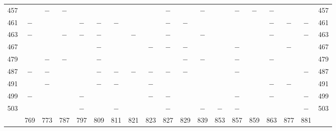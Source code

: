 \begin{center}
\begin{tabular}{r|c|c|c|c|c|c|c|c|c|c|c|c|c|c|c|c|c|r}
457 &  & $-$ & $-$ &  &  &  &  &  & $-$ &  & $-$ &  & $-$ & $-$ & $-$ &  &  & 457\\
461 & $-$ &  &  & $-$ & $-$ & $-$ &  &  & $-$ & $-$ &  &  &  &  & $-$ & $-$ & $-$ & 461\\
463 & $-$ &  & $-$ & $-$ & $-$ &  & $-$ &  & $-$ &  & $-$ &  &  &  & $-$ &  & $-$ & 463\\
467 &  &  &  &  & $-$ &  &  & $-$ & $-$ & $-$ &  &  & $-$ &  &  & $-$ &  & 467\\
479 &  & $-$ & $-$ &  & $-$ &  &  &  &  & $-$ & $-$ &  & $-$ &  & $-$ &  &  & 479\\
487 & $-$ & $-$ &  &  & $-$ & $-$ & $-$ & $-$ & $-$ & $-$ &  &  & $-$ &  &  &  & $-$ & 487\\
491 &  & $-$ &  &  & $-$ & $-$ &  & $-$ &  &  &  &  &  &  & $-$ & $-$ &  & 491\\
499 & $-$ &  &  & $-$ &  &  &  & $-$ & $-$ &  &  &  & $-$ &  & $-$ &  & $-$ & 499\\
503 &  &  &  & $-$ &  & $-$ &  &  & $-$ &  & $-$ & $-$ & $-$ &  &  &  & $-$ & 503\\
\hline
 & 769 & 773 & 787 & 797 & 809 & 811 & 821 & 823 & 827 & 829 & 839 & 853 & 857 & 859 & 863 & 877 & 881 & \\
\hline
\end{tabular}\endgroup\end{center}
\clearpage
